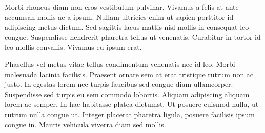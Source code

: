 \documentclass[12pt]{article}
\begin{document}
Morbi rhoncus diam non eros vestibulum pulvinar. Vivamus a felis at ante accumsan mollis ac a ipsum. Nullam ultricies enim ut sapien porttitor id adipiscing metus dictum. Sed sagittis lacus mattis nisl mollis in consequat leo congue. Suspendisse hendrerit pharetra tellus ut venenatis. Curabitur in tortor id leo mollis convallis. Vivamus eu ipsum erat.

Phasellus vel metus vitae tellus condimentum venenatis nec id leo. Morbi malesuada lacinia facilisis. Praesent ornare sem at erat tristique rutrum non ac justo. In egestas lorem nec turpis faucibus sed congue diam ullamcorper. Suspendisse sed turpis eu sem commodo lobortis. Aliquam adipiscing aliquam lorem ac semper. In hac habitasse platea dictumst. Ut posuere euismod nulla, ut rutrum nulla congue ut. Integer placerat pharetra ligula, posuere facilisis ipsum congue in. Mauris vehicula viverra diam sed mollis.
\end{document}
